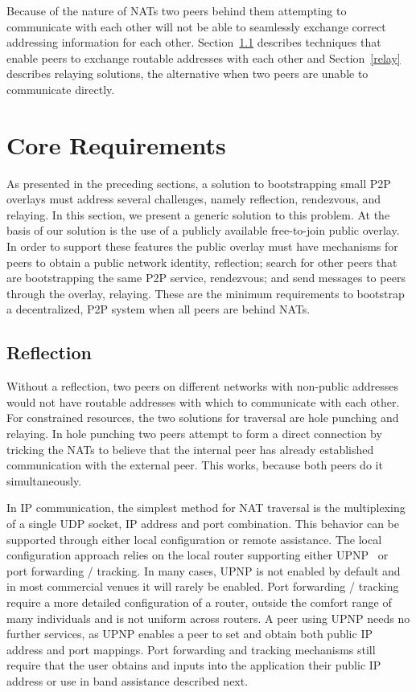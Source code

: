 \documentclass[conference]{IEEEtran}
\begin{document}
Because of the nature of NATs two peers behind them attempting to communicate
with each other will not be able to seamlessly exchange correct addressing
information for each other.  Section~\ref{reflection} describes techniques that
enable peers to exchange routable addresses with each other and
Section~\ref{relay} describes relaying solutions, the alternative when two
peers are unable to communicate directly.

\section{Core Requirements}
\label{overview}

As presented in the preceding sections, a solution to bootstrapping small P2P
overlays must address several challenges, namely reflection, rendezvous, and
relaying.  In this section, we present a generic solution to this problem.  At
the basis of our solution is the use of a publicly available free-to-join
public overlay.  In order to support these features the public overlay must
have mechanisms for peers to obtain a public network identity, reflection;
search for other peers that are bootstrapping the same P2P service, rendezvous;
and send messages to peers through the overlay, relaying.  These are the
minimum requirements to bootstrap a decentralized, P2P system when all peers
are behind NATs.

\subsection{Reflection}
\label{reflection}

Without a reflection, two peers on different networks with non-public addresses
would not have routable addresses with which to communicate with each other.
For constrained resources, the two solutions for traversal are hole punching
and relaying.  In hole punching two peers attempt to form a direct connection
by tricking the NATs to believe that the internal peer has already established
communication with the external peer.  This works, because both peers do it
simultaneously.

In IP communication, the simplest method for NAT traversal is the multiplexing
of a single UDP socket, IP address and port combination.  This behavior can be
supported through either local configuration or remote assistance.  The local
configuration approach relies on the local router supporting either
UPNP~\cite{upnp} or port forwarding / tracking.  In many cases, UPNP is not
enabled by default and in most commercial venues it will rarely be enabled.
Port forwarding / tracking require a more detailed configuration of a router,
outside the comfort range of many individuals and is not uniform across
routers.  A peer using UPNP needs no further services, as UPNP enables a peer
to set and obtain both public IP address and port mappings.  Port forwarding
and tracking mechanisms still require that the user obtains and inputs into the
application their public IP address or use in band assistance described next.
\end{document}
